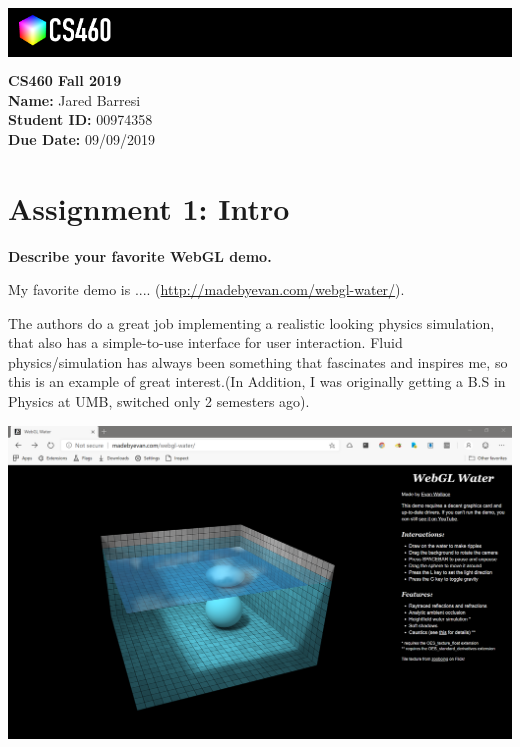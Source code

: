 \documentclass[10pt,oneside,onecolumn,letterpaper]{article}
\begin{document}
\noindent\colorbox{black}{
\begin{minipage}[c]{.99\linewidth}
  \vspace{.4cm}
  \Large{}
  \begin{flushright}
    \vspace{-1.2cm}
    \includegraphics[width=3cm]{gfx/cs460.png}
  \end{flushright}
\end{minipage}
}


\vspace{.5cm} %

\noindent\textbf{CS460 Fall 2019} \\
\textbf{Name:} Jared Barresi \\
\textbf{Student ID:} 00974358 \\
\textbf{Due Date:} 09/09/2019

\section*{Assignment 1: Intro}

\textbf{Describe your favorite WebGL demo.}

\vspace{.5cm} %

\noindent My favorite demo is .... (\url{http://madebyevan.com/webgl-water/}). 

\vspace{.5cm}

\noindent The authors do a great job implementing a realistic looking physics simulation, that also has a simple-to-use interface for user interaction. Fluid physics/simulation has always been something that fascinates and inspires me, so this is an example of great interest.(In Addition, I was originally getting a B.S in Physics at UMB, switched only 2 semesters ago).

\vspace{.5cm} %
\noindent\includegraphics[width=\textwidth]{gfx/full-screenshot-madebyevan_webgl_water.png}
\end{document}

